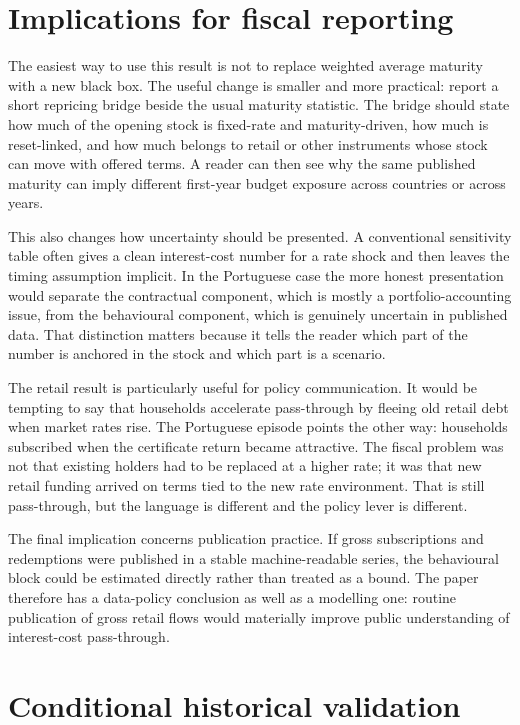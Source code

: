 \documentclass[11pt,a4paper]{article}
\begin{document}
\section{Implications for fiscal reporting}
\label{sec:implications}

The easiest way to use this result is not to replace weighted average maturity
with a new black box. The useful change is smaller and more practical: report a
short repricing bridge beside the usual maturity statistic. The bridge should
state how much of the opening stock is fixed-rate and maturity-driven, how much
is reset-linked, and how much belongs to retail or other instruments whose
stock can move with offered terms. A reader can then see why the same published
maturity can imply different first-year budget exposure across countries or
across years.

This also changes how uncertainty should be presented. A conventional
sensitivity table often gives a clean interest-cost number for a rate shock and
then leaves the timing assumption implicit. In the Portuguese case the more
honest presentation would separate the contractual component, which is mostly a
portfolio-accounting issue, from the behavioural component, which is genuinely
uncertain in published data. That distinction matters because it tells the
reader which part of the number is anchored in the stock and which part is a
scenario.

The retail result is particularly useful for policy communication. It would be
tempting to say that households accelerate pass-through by fleeing old retail
debt when market rates rise. The Portuguese episode points the other way:
households subscribed when the certificate return became attractive. The fiscal
problem was not that existing holders had to be replaced at a higher rate; it
was that new retail funding arrived on terms tied to the new rate environment.
That is still pass-through, but the language is different and the policy lever
is different.

The final implication concerns publication practice. If gross subscriptions and
redemptions were published in a stable machine-readable series, the
behavioural block could be estimated directly rather than treated as a bound.
The paper therefore has a data-policy conclusion as well as a modelling one:
routine publication of gross retail flows would materially improve public
understanding of interest-cost pass-through.

\section{Conditional historical validation}
\label{sec:backtest}
\end{document}
